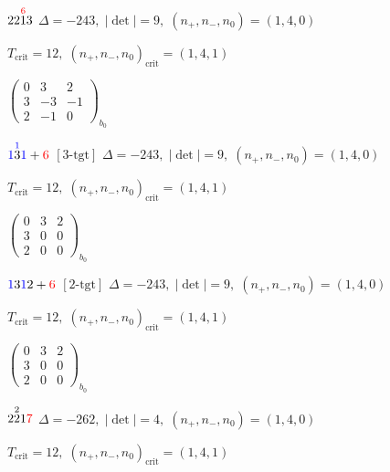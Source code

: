 \documentclass[10pt]{article}
\begin{document}
\smallskip

$22\overset{\textcolor{red}{6}}{1}3$ \quad $\Delta=-243,\; |\det|=9,\; (n_+,n_-,n_0)=(1,4,0)$

\hspace{1em}$T_{\text{crit}}=12,\; (n_+,n_-,n_0)_{\text{crit}}=(1,4,1)$

\hspace{2em}$\left(\begin{smallmatrix}0 & 3 & 2 \\ 3 & -3 & -1 \\ 2 & -1 & 0\end{smallmatrix}\right)_{\!b_0}$

\smallskip

$\textcolor{blue}{1}\overset{\textcolor{blue}{1}}{3}\textcolor{blue}{1}+\textcolor{red}{6}$ $\scriptstyle [3\text{-tgt}]$ \quad $\Delta=-243,\; |\det|=9,\; (n_+,n_-,n_0)=(1,4,0)$

\hspace{1em}$T_{\text{crit}}=12,\; (n_+,n_-,n_0)_{\text{crit}}=(1,4,1)$

\hspace{2em}$\left(\begin{smallmatrix}0 & 3 & 2 \\ 3 & 0 & 0 \\ 2 & 0 & 0\end{smallmatrix}\right)_{\!b_0}$

\smallskip

$\textcolor{blue}{1}3\textcolor{blue}{1}2+\textcolor{red}{6}$ $\scriptstyle [2\text{-tgt}]$ \quad $\Delta=-243,\; |\det|=9,\; (n_+,n_-,n_0)=(1,4,0)$

\hspace{1em}$T_{\text{crit}}=12,\; (n_+,n_-,n_0)_{\text{crit}}=(1,4,1)$

\hspace{2em}$\left(\begin{smallmatrix}0 & 3 & 2 \\ 3 & 0 & 0 \\ 2 & 0 & 0\end{smallmatrix}\right)_{\!b_0}$

\smallskip

$2\overset{2}{2}1\textcolor{red}{7}$ \quad $\Delta=-262,\; |\det|=4,\; (n_+,n_-,n_0)=(1,4,0)$

\hspace{1em}$T_{\text{crit}}=12,\; (n_+,n_-,n_0)_{\text{crit}}=(1,4,1)$
\end{document}
